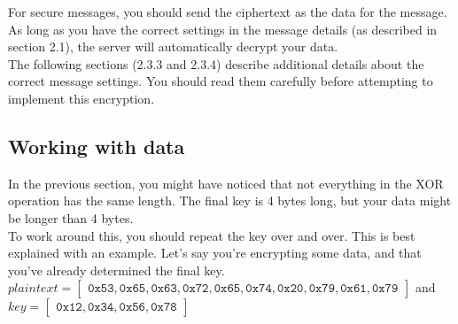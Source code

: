 \documentclass{report}
\newcommand{\code}[1]{\texttt{#1}}
\begin{document}
For secure messages, you should send the ciphertext as the data for the message.
As long as you have the correct settings in the message details (as described in section 2.1), the server will automatically decrypt your data. \\

The following sections (2.3.3 and 2.3.4) describe additional details about the correct message settings. You should read them carefully before attempting to implement this encryption.

\pagebreak
\subsection{Working with data}
In the previous section, you might have noticed that not everything in the XOR operation has the same length.
The final key is 4 bytes long, but your data might be longer than 4 bytes. \\

To work around this, you should repeat the key over and over. This is best explained with an example.
Let's say you're encrypting some data, and that you've already determined the final key. \\

$plaintext = \begin{bmatrix}
	\code{0x53}, \code{0x65}, \code{0x63}, \code{0x72}, \code{0x65}, \code{0x74}, \code{0x20}, \code{0x79}, \code{0x61}, \code{0x79}
\end{bmatrix}$ and $key = \begin{bmatrix}
	\code{0x12}, \code{0x34}, \code{0x56}, \code{0x78}
\end{bmatrix}$ \\
\end{document}

